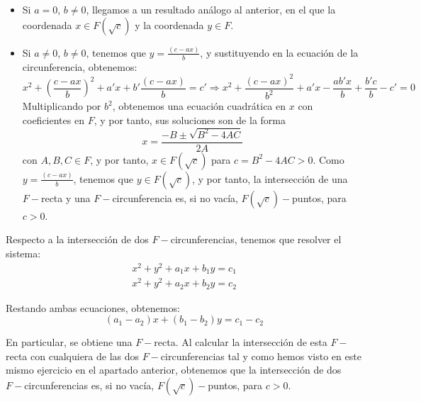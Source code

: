 \begin{ejercicio}
\begin{itemize}
        Por tanto, las soluciones del sistema son de la forma $\left(\nicefrac{c}{a}, y\right)$, con $y\in F(\sqrt{c})$ para $c=(b')^2 - 4D>0$. Como $x\in F\leq F(\sqrt{c})$, tenemos que la intersección de una $F-$recta y una $F-$circunferencia es, si no vacía, $F(\sqrt{c})-$puntos, para $c>0$.
        \item Si $a=0$, $b\neq 0$, llegamos a un resultado análogo al anterior, en el que la coordenada $x\in F(\sqrt{c})$ y la coordenada $y\in F$.
        \item Si $a\neq 0$, $b\neq 0$, tenemos que $y = \frac{(c-ax)}{b}$, y sustituyendo en la ecuación de la circunferencia, obtenemos:
        \begin{equation*}
            x^2 + \left(\frac{c-ax}{b}\right)^2 + a'x + b'\frac{(c-ax)}{b} = c' \Longrightarrow x^2 + \frac{(c-ax)^2}{b^2} + a'x - \frac{ab'x}{b} + \frac{b'c}{b} - c' = 0
        \end{equation*}
        Multiplicando por $b^2$, obtenemos una ecuación cuadrática en $x$ con coeficientes en $F$, y por tanto, sus soluciones son de la forma
        \begin{equation*}
            x = \frac{-B \pm \sqrt{B^2 - 4AC}}{2A}
        \end{equation*}
        con $A,B,C\in F$, y por tanto, $x\in F(\sqrt{c})$ para $c=B^2 - 4AC>0$. Como $y = \frac{(c-ax)}{b}$, tenemos que $y\in F(\sqrt{c})$, y por tanto, la intersección de una $F-$recta y una $F-$circunferencia es, si no vacía, $F(\sqrt{c})-$puntos, para $c>0$.
    \end{itemize}

    Respecto a la intersección de dos $F-$circunferencias, tenemos que resolver el sistema:
    \begin{align*}
        x^2 + y^2 + a_1x + b_1y = c_1 \\
        x^2 + y^2 + a_2x + b_2y = c_2
    \end{align*}
    
    Restando ambas ecuaciones, obtenemos:
    \begin{equation*}
        (a_1-a_2)x + (b_1-b_2)y = c_1-c_2
    \end{equation*}

    En particular, se obtiene una $F-$recta. Al calcular la intersección de esta $F-$recta con cualquiera de las dos $F-$circunferencias tal y como hemos visto en este mismo ejercicio en el apartado anterior, obtenemos que la intersección de dos $F-$circunferencias es, si no vacía, $F(\sqrt{c})-$puntos, para $c>0$.
\end{ejercicio}

